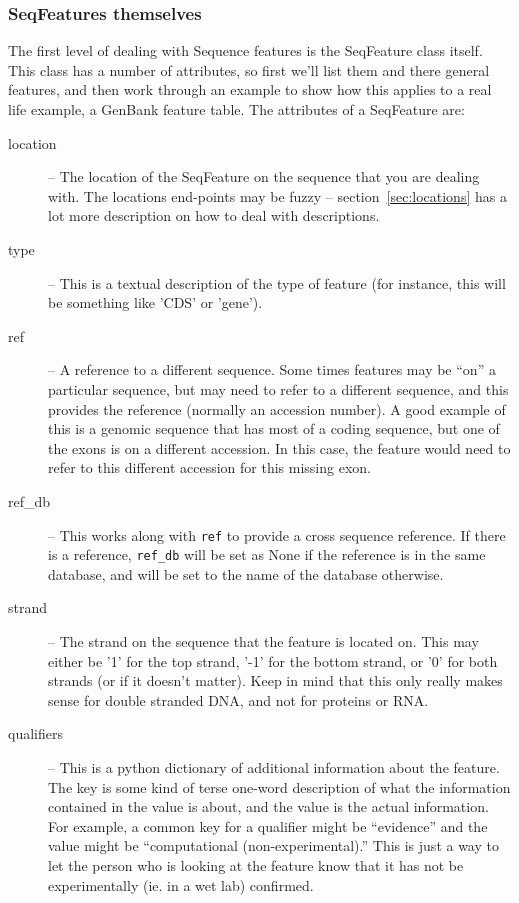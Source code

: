 \documentclass{report}
\begin{document}
\subsubsection{SeqFeatures themselves}

The first level of dealing with Sequence features is the SeqFeature class itself. This class has a number of attributes, so first we'll list them and there general features, and then work through an example to show how this applies to a real life example, a GenBank feature table. The attributes of a SeqFeature are:

\begin{description}
  \item[location] -- The location of the SeqFeature on the sequence that you are dealing with. The locations end-points may be fuzzy -- section~\ref{sec:locations} has a lot more description on how to deal with descriptions.

  \item[type] -- This is a textual description of the type of feature (for instance, this will be something like 'CDS' or 'gene').

  \item[ref] -- A reference to a different sequence. Some times features may be ``on'' a particular sequence, but may need to refer to a different sequence, and this provides the reference (normally an accession number). A good example of this is a genomic sequence that has most of a coding sequence, but one of the exons is on a different accession. In this case, the feature would need to refer to this different accession for this missing exon.

  \item[ref\_db] -- This works along with \verb|ref| to provide a cross sequence reference. If there is a reference, \verb|ref_db| will be set as None if the reference is in the same database, and will be set to the name of the database otherwise.

  \item[strand] -- The strand on the sequence that the feature is located on. This may either be '1' for the top strand, '-1' for the bottom strand, or '0' for both strands (or if it doesn't matter). Keep in mind that this only really makes sense for double stranded DNA, and not for proteins or RNA. 

  \item[qualifiers] -- This is a python dictionary of additional information about the feature. The key is some kind of terse one-word description of what the information contained in the value is about, and the value is the actual information. For example, a common key for a qualifier might be ``evidence'' and the value might be ``computational (non-experimental).'' This is just a way to let the person who is looking at the feature know that it has not be experimentally (ie. in a wet lab) confirmed.
  

\end{description}
\end{document}
